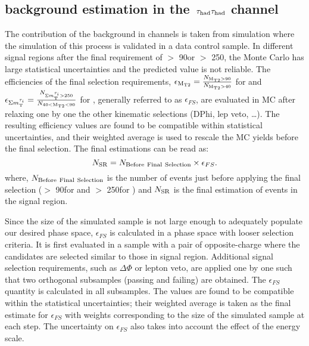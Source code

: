 \subsection{\texorpdfstring{\wjets background estimation in the $\,\tau_{\rm had}\tau_{\rm had}$ channel}{W+jets background estimation in the tau-tau channel}}
\label{sect:bkgW}
The contribution of the \wjets background in \tauTau channels is taken from simulation where the simulation of this process is validated in a data control sample. 
In different signal regions after the final requirement of \mttwo $>$ 90\GeV or \SumMT $>$ 250\GeV, 
the \wjets Monte Carlo has large statistical uncertainties and the predicted value is not reliable. 
The efficiencies of the final selection requirements, $\epsilon_{\rm M_{T2}}=\frac{N_{\rm M_{T2}>90}}{N_{\rm M_{T2}>40}}$ for  \binone and $\epsilon_{\Sigma m_{\rm T}^{\tau_i}}=\frac{N_{\Sigma m_{\rm T}^{\tau_i}>250}}{N_{40<\rm M_{T2}<90}}$ for \bintwo, generally referred to as $\epsilon_{FS}$, are evaluated in MC after relaxing one by one the other kinematic selections (DPhi, lep veto, …). The resulting efficiency values are found to be compatible within statistical uncertainties, and their weighted average is used to rescale the MC yields before the final selection.
The final estimations can be read as:
\begin{equation}
N_{\rm SR} = N_{\rm Before~Final~Selection} \times \epsilon_{FS}.
\end{equation}
where, $N_{\rm Before~Final~Selection}$ is the number of \wjets events just before applying the final selection 
(\mttwo $>$ 90\GeV for \binone and \SumMT $>$ 250\GeV for \bintwo) and $N_{\rm SR}$ is the final estimation of \wjets events in the signal region.

Since the size of the simulated \wjets sample is not large enough to adequately populate our desired phase space, %
$\epsilon_{FS}$ is calculated in a phase space with looser selection criteria. It is first evaluated in a \wjets sample with a pair of opposite-charge \Tau where the \Tau candidates are selected similar to those in signal region. 
Additional signal selection requirements, such as $\Delta \Phi$ or lepton veto, are applied one by one such that two orthogonal subsamples (passing and failing) are obtained. The $\epsilon_{FS}$ quantity is calculated in all subsamples. The values are found to be compatible within the statistical uncertainties; their weighted average is taken as the final estimate for $\epsilon_{FS}$ with weights corresponding to the size of the simulated sample at each step. %
The uncertainty on $\epsilon_{FS}$  also takes into account the effect of the \Tau energy scale.


